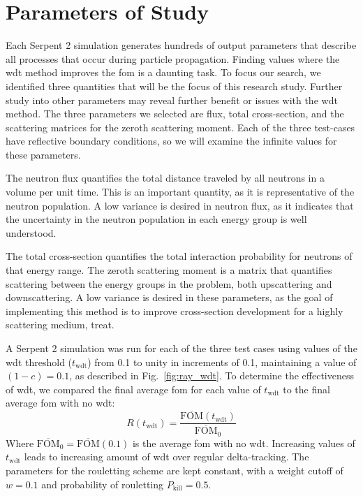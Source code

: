 \section{Parameters of Study}
\label{sec:parameters}
Each Serpent 2 simulation generates hundreds of output parameters that
describe all processes that occur during particle propagation. Finding
values where the \gls{wdt} method improves the \gls{fom} is a daunting
task. To focus our search, we identified three  quantities that
will be the focus of this research study. Further study into other
parameters may reveal further benefit or issues with the \gls{wdt}
method. The three parameters we selected are flux, 
total cross-section, and the scattering matrices for the
zeroth scattering moment. Each of the three test-cases have
reflective boundary conditions, so we will examine the infinite values for these
parameters.

The neutron flux quantifies the total distance traveled by all
neutrons in a volume per unit time. This is an important quantity, as
it is representative of the neutron population. A low variance is
desired in neutron flux, as it indicates that the uncertainty in the
neutron population in each energy group is well
understood.

The total cross-section quantifies the total interaction probability
for neutrons of that energy range. The zeroth scattering moment is a
matrix that quantifies scattering between the energy groups in the
problem, both upscattering and downscattering. A low variance is
desired in these parameters, as the goal of implementing this method
is to improve cross-section development for a highly scattering
medium, \gls{treat}.

A Serpent 2 simulation was run for each of the three test cases using
values of the \gls{wdt} threshold ($t_\mathrm{wdt}$) from 0.1 to unity in increments of
0.1, maintaining a value of $(1-c) = 0.1$, as described in
Fig.~\ref{fig:ray_wdt}. To determine the effectiveness of \gls{wdt},
we compared the final average \gls{fom} for each value of
$t_{\mathrm{wdt}}$ to the final average \gls{fom} with no \gls{wdt}:
\begin{equation*}
  R(t_{\mathrm{wdt}}) =
  \frac{\overline{\mathrm{FOM}}(t_\mathrm{wdt})}{\overline{\mathrm{FOM}}_0}
\end{equation*}
Where $\overline{\mathrm{FOM}}_0 =
\overline{\mathrm{FOM}}(0.1)$ is
the average \gls{fom} with no \gls{wdt}. Increasing values of
$t_{\mathrm{wdt}}$ leads to increasing amount of \gls{wdt} over
regular delta-tracking. The parameters for the rouletting scheme are
kept constant, with a weight cutoff of $w = 0.1$ and probability of
rouletting $P_{\mathrm{kill}} = 0.5$.

